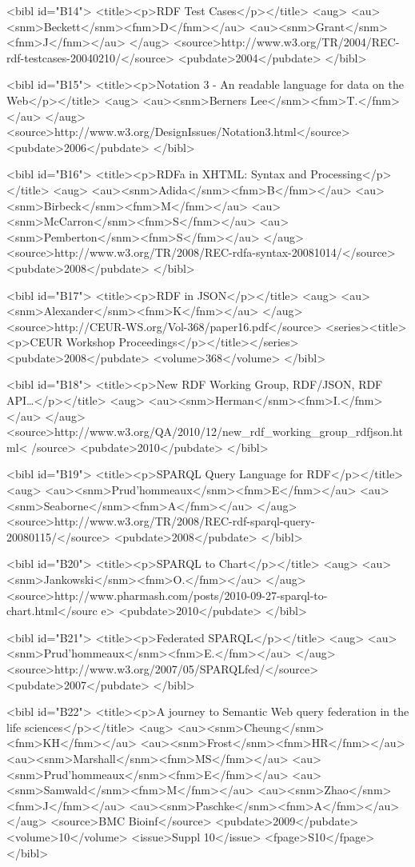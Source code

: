 \documentclass[10pt]{bmc_article}
\newenvironment{bmcformat}{\begin{raggedright}\baselineskip20pt\sloppy\setboolean{publ}{false}}{\end{raggedright}\baselineskip20pt\sloppy}
\begin{document}
\begin{bmcformat}
{<bibl id="B14">
  <title><p>{RDF} Test Cases</p></title>
  <aug>
    <au><snm>Beckett</snm><fnm>D</fnm></au>
    <au><snm>Grant</snm><fnm>J</fnm></au>
  </aug>
  <source>http://www.w3.org/TR/2004/REC-rdf-testcases-20040210/</source>
  <pubdate>2004</pubdate>
</bibl>

<bibl id="B15">
  <title><p>Notation 3 - An readable language for data on the Web</p></title>
  <aug>
    <au><snm>Berners Lee</snm><fnm>T.</fnm></au>
  </aug>
  <source>http://www.w3.org/DesignIssues/Notation3.html</source>
  <pubdate>2006</pubdate>
</bibl>

<bibl id="B16">
  <title><p>{RDFa} in {XHTML}: Syntax and Processing</p></title>
  <aug>
    <au><snm>Adida</snm><fnm>B</fnm></au>
    <au><snm>Birbeck</snm><fnm>M</fnm></au>
    <au><snm>McCarron</snm><fnm>S</fnm></au>
    <au><snm>Pemberton</snm><fnm>S</fnm></au>
  </aug>
  <source>http://www.w3.org/TR/2008/REC-rdfa-syntax-20081014/</source>
  <pubdate>2008</pubdate>
</bibl>

<bibl id="B17">
  <title><p>{RDF} in {JSON}</p></title>
  <aug>
    <au><snm>Alexander</snm><fnm>K</fnm></au>
  </aug>
  <source>http://CEUR-WS.org/Vol-368/paper16.pdf</source>
  <series><title><p>CEUR Workshop Proceedings</p></title></series>
  <pubdate>2008</pubdate>
  <volume>368</volume>
</bibl>

<bibl id="B18">
  <title><p>New {RDF} Working Group, {RDF}/{JSON}, {RDF} {API}…</p></title>
  <aug>
    <au><snm>Herman</snm><fnm>I.</fnm></au>
  </aug>
  <source>http://www.w3.org/QA/2010/12/new\_rdf\_working\_group\_rdfjson.html<%
/source>
  <pubdate>2010</pubdate>
</bibl>

<bibl id="B19">
  <title><p>{SPARQL} Query Language for {RDF}</p></title>
  <aug>
    <au><snm>Prud'hommeaux</snm><fnm>E</fnm></au>
    <au><snm>Seaborne</snm><fnm>A</fnm></au>
  </aug>
  <source>http://www.w3.org/TR/2008/REC-rdf-sparql-query-20080115/</source>
  <pubdate>2008</pubdate>
</bibl>

<bibl id="B20">
  <title><p>{SPARQL} to Chart</p></title>
  <aug>
    <au><snm>Jankowski</snm><fnm>O.</fnm></au>
  </aug>
  <source>http://www.pharmash.com/posts/2010-09-27-sparql-to-chart.html</sourc%
e>
  <pubdate>2010</pubdate>
</bibl>

<bibl id="B21">
  <title><p>Federated {SPARQL}</p></title>
  <aug>
    <au><snm>Prud'hommeaux</snm><fnm>E.</fnm></au>
  </aug>
  <source>http://www.w3.org/2007/05/SPARQLfed/</source>
  <pubdate>2007</pubdate>
</bibl>

<bibl id="B22">
  <title><p>A journey to Semantic Web query federation in the life
  sciences</p></title>
  <aug>
    <au><snm>Cheung</snm><fnm>KH</fnm></au>
    <au><snm>Frost</snm><fnm>HR</fnm></au>
    <au><snm>Marshall</snm><fnm>MS</fnm></au>
    <au><snm>Prud'hommeaux</snm><fnm>E</fnm></au>
    <au><snm>Samwald</snm><fnm>M</fnm></au>
    <au><snm>Zhao</snm><fnm>J</fnm></au>
    <au><snm>Paschke</snm><fnm>A</fnm></au>
  </aug>
  <source>BMC Bioinf</source>
  <pubdate>2009</pubdate>
  <volume>10</volume>
  <issue>Suppl 10</issue>
  <fpage>S10</fpage>
</bibl>

}
\end{bmcformat}
\end{document}
